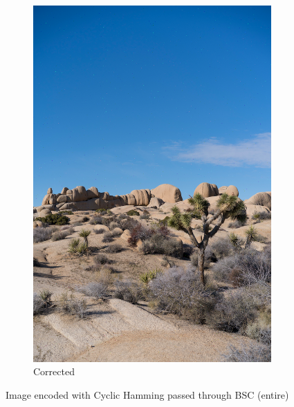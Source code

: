 \documentclass{article}
\begin{document}
\begin{figure}[htb]
\begin{subfigure}[b]{0.32\textwidth}
        \includegraphics[width=\textwidth]{../Result/cyclic-bsc-output-syndrome-corrected.png}
        \caption{Corrected}
        \label{fig:image-cyclic-bsc-syndrome-corrected}
    \end{subfigure}
       \caption{Image encoded with Cyclic Hamming passed through BSC (entire)}
       \label{fig:image-cyclic-bsc}
\end{figure}
\end{document}

